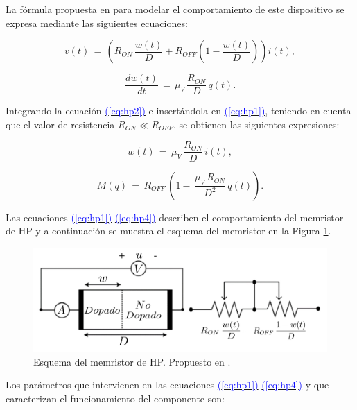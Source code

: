 \documentclass[12pt,a4paper]{report} %
\newcommand{\eref}[1]{\hyperref[#1]{\textcolor{blue}{(\ref*{#1})}}}
\newcommand{\eref}[1]{\hyperref[#1]{\textcolor{blue}{\textit{(\ref*{#1})}}}}
\begin{document}
	\vspace{0.5cm}La fórmula propuesta en \cite{HP} para modelar el comportamiento de este dispositivo se expresa mediante las siguientes ecuaciones:
	
	\begin{equation}
		v(t)\,=\,\left(R_{ON}\,\frac{w(t)}{D}+R_{OFF}\left(1-\frac{w(t)}{D}\right)\right)i(t),
		\label{eq:hp1}
	\end{equation}\smallskip
	
	\begin{equation}
		\frac{dw(t)}{dt}\,=\,\mu_V\,\frac{R_{ON}}{D}\,q(t).
		\label{eq:hp2}
	\end{equation}\smallskip
	
	\noindent Integrando la ecuación \eref{eq:hp2} e insertándola en \eref{eq:hp1}, teniendo en cuenta que el valor de resistencia $R_{ON} \ll R_{OFF}$, se obtienen las siguientes expresiones:
	
	\begin{equation}
		w(t)\,=\,\mu_V\,\frac{R_{ON}}{D}\,i(t),
		\label{eq:hp3}
	\end{equation}\smallskip
	
	\begin{equation}
		M(q)\,=\,R_{OFF}\,\left(1-\,\frac{\mu_V\,R_{ON}}{D^2}\,q(t)\right).
		\label{eq:hp4}
	\end{equation}\smallskip
	
	 Las ecuaciones \eref{eq:hp1}-\eref{eq:hp4} describen el comportamiento del memristor de HP y a continuación se muestra el esquema del memristor en la Figura \ref{fig:2021}.
	 
	 \newpage
	
	\vspace{0.5cm}\begin{figure}[h]
		\centering
		\includegraphics[width=1\textwidth]{schmem.jpg}
		\caption{Esquema del memristor de HP. Propuesto en \cite{2021}.}
		\label{fig:2021}
	\end{figure}\smallskip
	
	 \vspace{0.5cm}Los parámetros que intervienen en las ecuaciones \eref{eq:hp1}-\eref{eq:hp4} y que caracterizan el funcionamiento del componente son:
	
\end{document}
